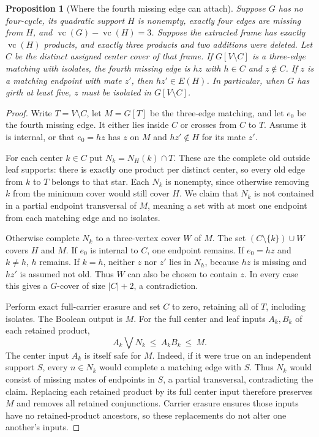\documentclass[11pt]{article}
\newcommand{\vc}{\operatorname{vc}}
\newtheorem{proposition}[theorem]{Proposition}
\theoremstyle{definition}
\theoremstyle{remark}
\begin{document}
\begin{proposition}[Where the fourth missing edge can attach]\label{prop:fourthattachment}
Suppose $G$ has no four-cycle, its quadratic support $H$ is nonempty, exactly four edges are missing from $H$, and $\vc(G)-\vc(H)=3$. Suppose the extracted frame has exactly $\vc(H)$ products, and exactly three products and two additions were deleted. Let $C$ be the distinct assigned center cover of that frame. If $G[V\setminus C]$ is a three-edge matching with isolates, the fourth missing edge is $hz$ with $h\in C$ and $z\notin C$. If $z$ is a matching endpoint with mate $z'$, then $hz'\in E(H)$. In particular, when $G$ has girth at least five, $z$ must be isolated in $G[V\setminus C]$.
\end{proposition}
\begin{proof}
Write $T=V\setminus C$, let $M=G[T]$ be the three-edge matching, and let $e_0$ be the fourth missing edge. It either lies inside $C$ or crosses from $C$ to $T$. Assume it is internal, or that $e_0=hz$ has $z$ on $M$ and $hz'\notin H$ for its mate $z'$.

For each center $k\in C$ put $N_k=N_H(k)\cap T$. These are the complete old outside leaf supports: there is exactly one product per distinct center, so every old edge from $k$ to $T$ belongs to that star. Each $N_k$ is nonempty, since otherwise removing $k$ from the minimum cover would still cover $H$. We claim that $N_k$ is not contained in a partial endpoint transversal of $M$, meaning a set with at most one endpoint from each matching edge and no isolates.

Otherwise complete $N_k$ to a three-vertex cover $W$ of $M$. The set $(C\setminus\{k\})\cup W$ covers $H$ and $M$. If $e_0$ is internal to $C$, one endpoint remains. If $e_0=hz$ and $k\ne h$, $h$ remains. If $k=h$, neither $z$ nor $z'$ lies in $N_h$, because $hz$ is missing and $hz'$ is assumed not old. Thus $W$ can also be chosen to contain $z$. In every case this gives a $G$-cover of size $|C|+2$, a contradiction.

Perform exact full-carrier erasure and set $C$ to zero, retaining all of $T$, including isolates. The Boolean output is $M$. For the full center and leaf inputs $A_k,B_k$ of each retained product,
\[
 A_k\bigvee N_k\ \le\ A_kB_k\ \le\ M.
\]
The center input $A_k$ is itself safe for $M$. Indeed, if it were true on an independent support $S$, every $n\in N_k$ would complete a matching edge with $S$. Thus $N_k$ would consist of missing mates of endpoints in $S$, a partial transversal, contradicting the claim. Replacing each retained product by its full center input therefore preserves $M$ and removes all retained conjunctions. Carrier erasure ensures those inputs have no retained-product ancestors, so these replacements do not alter one another's inputs.


\end{proof}
\end{document}
